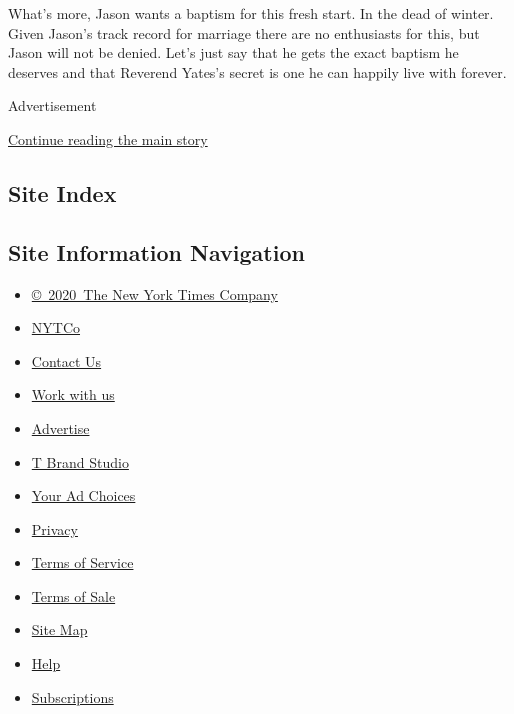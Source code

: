 What's more, Jason wants a baptism for this fresh start. In the dead of
winter. Given Jason's track record for marriage there are no enthusiasts
for this, but Jason will not be denied. Let's just say that he gets the
exact baptism he deserves and that Reverend Yates's secret is one he can
happily live with forever.

Advertisement

\protect\hyperlink{after-bottom}{Continue reading the main story}

\hypertarget{site-index}{%
\subsection{Site Index}\label{site-index}}

\hypertarget{site-information-navigation}{%
\subsection{Site Information
Navigation}\label{site-information-navigation}}

\begin{itemize}
\tightlist
\item
  \href{https://help.nytimes3xbfgragh.onion/hc/en-us/articles/115014792127-Copyright-notice}{©~2020~The
  New York Times Company}
\end{itemize}

\begin{itemize}
\tightlist
\item
  \href{https://www.nytco.com/}{NYTCo}
\item
  \href{https://help.nytimes3xbfgragh.onion/hc/en-us/articles/115015385887-Contact-Us}{Contact
  Us}
\item
  \href{https://www.nytco.com/careers/}{Work with us}
\item
  \href{https://nytmediakit.com/}{Advertise}
\item
  \href{http://www.tbrandstudio.com/}{T Brand Studio}
\item
  \href{https://www.nytimes3xbfgragh.onion/privacy/cookie-policy\#how-do-i-manage-trackers}{Your
  Ad Choices}
\item
  \href{https://www.nytimes3xbfgragh.onion/privacy}{Privacy}
\item
  \href{https://help.nytimes3xbfgragh.onion/hc/en-us/articles/115014893428-Terms-of-service}{Terms
  of Service}
\item
  \href{https://help.nytimes3xbfgragh.onion/hc/en-us/articles/115014893968-Terms-of-sale}{Terms
  of Sale}
\item
  \href{https://spiderbites.nytimes3xbfgragh.onion}{Site Map}
\item
  \href{https://help.nytimes3xbfgragh.onion/hc/en-us}{Help}
\item
  \href{https://www.nytimes3xbfgragh.onion/subscription?campaignId=37WXW}{Subscriptions}
\end{itemize}
